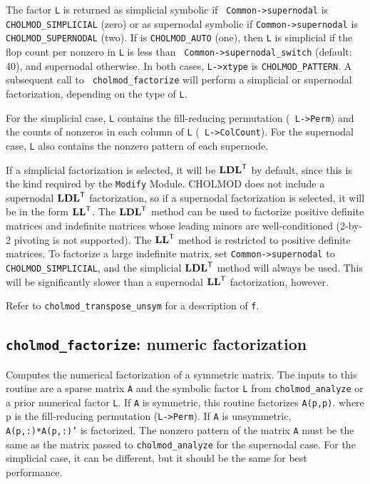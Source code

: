 \documentclass[11pt]{article}
\newcommand{\m}[1]{{\bf{#1}}}       %
\newcommand{\tr}{^{\sf T}}          %
\begin{document}
The factor {\tt L} is returned as simplicial symbolic if {\tt
Common->supernodal} is {\tt CHOLMOD\_SIMPLICIAL} (zero) or as supernodal
symbolic if {\tt Common->supernodal} is {\tt CHOLMOD\_SUPERNODAL} (two).  If
 is {\tt CHOLMOD\_AUTO} (one), then {\tt L} is
simplicial if the flop count per nonzero in {\tt L} is less than {\tt
Common->supernodal\_switch} (default: 40), and supernodal otherwise.  In both
cases, {\tt L->xtype} is {\tt CHOLMOD\_PATTERN}.  A subsequent call to {\tt
cholmod\_factorize} will perform a simplicial or supernodal factorization,
depending on the type of {\tt L}.

For the simplicial case, {\tt L} contains the fill-reducing permutation ({\tt
L->Perm}) and the counts of nonzeros in each column of {\tt L} ({\tt
L->ColCount}).  For the supernodal case, {\tt L} also contains the nonzero
pattern of each supernode.

If a simplicial factorization is selected, it will be $\m{LDL}\tr$ by default,
since this is the kind required by the {\tt Modify} Module.  CHOLMOD does not
include a supernodal $\m{LDL}\tr$ factorization, so if a supernodal
factorization is selected, it will be in the form $\m{LL}\tr$.  The
$\m{LDL}\tr$ method can be used to factorize positive definite matrices and
indefinite matrices whose leading minors are well-conditioned (2-by-2 pivoting
is not supported).  The $\m{LL}\tr$ method is restricted to positive definite
matrices.  To factorize a large indefinite matrix, set {\tt Common->supernodal}
to {\tt CHOLMOD\_SIMPLICIAL}, and the simplicial $\m{LDL}\tr$ method will
always be used.  This will be significantly slower than a supernodal
$\m{LL}\tr$ factorization, however.

Refer to {\tt cholmod\_transpose\_unsym} for a description of {\tt f}.

\subsection{{\tt cholmod\_factorize}: numeric factorization}

 Computes the numerical factorization of a symmetric
matrix.  The inputs to this routine are a sparse matrix {\tt A} and the
symbolic factor {\tt L} from {\tt cholmod\_analyze} or a prior numerical factor
{\tt L}.  If {\tt A} is symmetric, this routine factorizes {\tt A(p,p)}.  where
p is the fill-reducing permutation ({\tt L->Perm}).  If {\tt A} is unsymmetric,
{\tt A(p,:)*A(p,:)'} is factorized.  The nonzero pattern of the matrix {\tt A}
must be the same as the matrix passed to {\tt cholmod\_analyze} for the
supernodal case.  For the simplicial case, it can be different, but it should
be the same for best performance.
\end{document}
